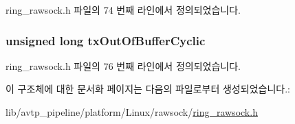 ring\+\_\+rawsock.\+h 파일의 74 번째 라인에서 정의되었습니다.

\subsubsection[{\texorpdfstring{tx\+Out\+Of\+Buffer\+Cyclic}{txOutOfBufferCyclic}}]{\setlength{\rightskip}{0pt plus 5cm}unsigned long tx\+Out\+Of\+Buffer\+Cyclic}\hypertarget{structring__rawsock__t_ab72f6e390a1b3447a247f4c70c6ff8d0}{}\label{structring__rawsock__t_ab72f6e390a1b3447a247f4c70c6ff8d0}


ring\+\_\+rawsock.\+h 파일의 76 번째 라인에서 정의되었습니다.



이 구조체에 대한 문서화 페이지는 다음의 파일로부터 생성되었습니다.\+:\begin{DoxyCompactItemize}
\item 
lib/avtp\+\_\+pipeline/platform/\+Linux/rawsock/\hyperlink{ring__rawsock_8h}{ring\+\_\+rawsock.\+h}\end{DoxyCompactItemize}

